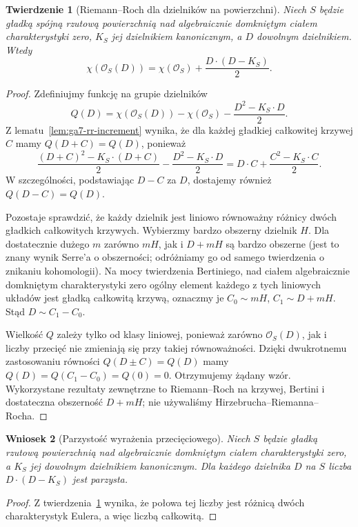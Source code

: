 \documentclass[11pt,a4paper,openany]{report}
\numberwithin{equation}{section}
\theoremstyle{plain}
\newtheorem{twierdzenie}{Twierdzenie}[section]
\newtheorem{wniosek}[twierdzenie]{Wniosek}
\theoremstyle{definition}
\theoremstyle{remark}
\begin{document}
\begin{twierdzenie}[Riemann--Roch dla dzielników na powierzchni]
\label{tw:ga7-rr-surfaces}
Niech $S$ będzie gładką spójną rzutową powierzchnią
nad algebraicznie domkniętym ciałem charakterystyki zero,
$K_S$ jej dzielnikiem kanonicznym, a $D$ dowolnym dzielnikiem.
Wtedy
\[
\chi(\mathcal O_S(D))=\chi(\mathcal O_S)
+\frac{D\cdot(D-K_S)}{2}.
\]
\end{twierdzenie}
\begin{proof}
Zdefiniujmy funkcję na grupie dzielników
\[
Q(D)=\chi(\mathcal O_S(D))-\chi(\mathcal O_S)
-\frac{D^2-K_S\cdot D}{2}.
\]
Z lematu~\ref{lem:ga7-rr-increment} wynika, że
dla każdej gładkiej całkowitej krzywej $C$ mamy
$Q(D+C)=Q(D)$, ponieważ
\[
\frac{(D+C)^2-K_S\cdot(D+C)}{2}
-\frac{D^2-K_S\cdot D}{2}
=D\cdot C+\frac{C^2-K_S\cdot C}{2}.
\]
W szczególności, podstawiając $D-C$ za $D$,
dostajemy również $Q(D-C)=Q(D)$.

Pozostaje sprawdzić, że każdy dzielnik jest liniowo
równoważny różnicy dwóch gładkich całkowitych krzywych.
Wybierzmy bardzo obszerny dzielnik $H$.
Dla dostatecznie dużego $m$ zarówno $mH$,
jak i $D+mH$ są bardzo obszerne (jest to znany
wynik Serre'a o obszerności; odróżniamy go od
samego twierdzenia o znikaniu kohomologii).
Na mocy twierdzenia Bertiniego, nad ciałem
algebraicznie domkniętym charakterystyki zero
ogólny element każdego z tych liniowych układów
jest gładką całkowitą krzywą, oznaczmy je
$C_0\sim mH$, $C_1\sim D+mH$.
Stąd $D\sim C_1-C_0$.

Wielkość $Q$ zależy tylko od klasy liniowej,
ponieważ zarówno $\mathcal O_S(D)$, jak i liczby
przecięć nie zmieniają się przy takiej równoważności.
Dzięki dwukrotnemu zastosowaniu równości
$Q(D\pm C)=Q(D)$ mamy
$Q(D)=Q(C_1-C_0)=Q(0)=0$.
Otrzymujemy żądany wzór. Wykorzystane rezultaty
zewnętrzne to Riemann--Roch na krzywej,
Bertini i dostateczna obszerność $D+mH$;
nie używaliśmy Hirzebrucha--Riemanna--Rocha.
\end{proof}

\begin{wniosek}[Parzystość wyrażenia przecięciowego]
\label{wn:ga7-parity}
Niech $S$ będzie gładką rzutową powierzchnią
nad algebraicznie domkniętym ciałem charakterystyki zero,
a $K_S$ jej dowolnym dzielnikiem kanonicznym.
Dla każdego dzielnika $D$ na $S$ liczba
$D\cdot(D-K_S)$ jest parzysta.
\end{wniosek}
\begin{proof}
Z twierdzenia~\ref{tw:ga7-rr-surfaces} wynika,
że połowa tej liczby jest różnicą dwóch
charakterystyk Eulera, a więc liczbą całkowitą.
\end{proof}
\end{document}
